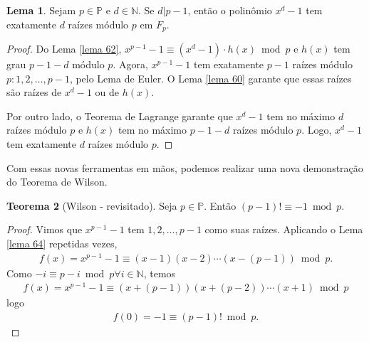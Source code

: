 \documentclass[a4paper,11pt,twoside, leqno]{article}
\theoremstyle{definition}
\newtheorem{theorem}{Teorema}[section]
\newtheorem{lemma}[theorem]{Lema}
\begin{document}
\begin{lemma}
	\label{lema 65}
	Sejam $p\in\mathbb{P}$ e $d\in\mathbb{N}$. Se $d|p-1$, então o polinômio $x^d - 1$ tem exatamente $d$ raízes módulo $p$ em $F_p$.
\end{lemma}
\begin{proof}
	Do Lema \eqref{lema 62}, $x^{p-1} - 1\equiv (x^d - 1)\cdot h(x)\bmod p$ e $h(x)$ tem grau $p-1-d$ módulo $p$. Agora, $x^{p-1} - 1$ tem exatamente $p-1$ raízes módulo $p: 1,2,\dots,p-1$, pelo Lema de Euler. O Lema \eqref{lema 60} garante que essas raízes são raízes de $x^d - 1$ ou de $h(x)$.
	\par\vspace{0.3cm} Por outro lado, o Teorema de Lagrange garante que $x^d - 1$ tem no máximo $d$ raízes módulo $p$ e $h(x)$ tem no máximo $p-1-d$ raízes módulo $p$. Logo, $x^d - 1$ tem exatamente $d$ raízes módulo $p$.
\end{proof}
Com essas novas ferramentas em mãos, podemos realizar uma nova demonstração do Teorema de Wilson.
\begin{theorem}[Wilson - revisitado]
	Seja $p\in\mathbb{P}$. Então $(p-1)!\equiv -1\bmod p$.
\end{theorem}
\begin{proof}
	Vimos que $x^{p-1} - 1$ tem $1,2,\dots,p-1$ como suas raízes. Aplicando o Lema \eqref{lema 64} repetidas vezes,
	\begin{align*}
	f(x) = x^{p-1} - 1\equiv (x-1)(x-2)\cdots (x-(p-1))\bmod p.
	\end{align*}
	Como $-i\equiv p-i\bmod p\forall i\in\mathbb{N}$, temos
	\begin{align*}
	f(x) = x^{p-1} - 1\equiv (x+(p-1))(x + (p-2))\cdots (x+1)\bmod p
	\end{align*}
	logo
	\begin{align*}
	f(0) = -1 \equiv (p-1)!\bmod p.
	\end{align*}
\end{proof}
\end{document}
